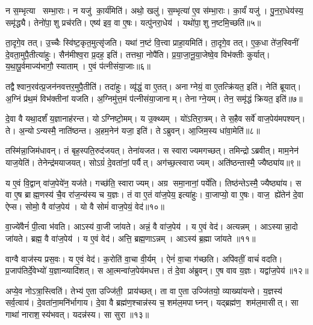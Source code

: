 न स॒म्भृत्या सम्भा॒राः।
न यजु॑ का॒र्य॑मिति॑।
अथो॒ खलु॑।
स॒म्भृत्या॑ ए॒व स॑म्भा॒राः।
का॒र्यं॑ यजु॑।
पु॒न॒रा॒धेय॑स्य॒ समृ॑द्ध्यै।
तेनो॑पा॒शु प्रच॑रति।
एष्य॑ इव॒ वा ए॒षः।
यत्पु॑नरा॒धेय॑।
यथो॑पा॒शु न॒ष्टमि॒च्छति॑॥५॥

ता॒दृगे॒व तत्।
उ॒च्चैः स्वि॑ष्ट॒कृत॒मुत्सृ॑जति।
यथा॑ न॒ष्टं वि॒त्त्वा प्राहा॒यमिति॑।
ता॒दृगे॒व तत्।
ए॒क॒धा ते॑ज॒स्विनीं दे॒वता॒मुपै॒तीत्या॑हुः।
सैन॑मीश्व॒रा प्र॒दह॒ इति॑।
तत्तथा॒ नोपै॑ति।
प्र॒या॒जा॒नू॒या॒जेष्वे॒व विभ॑क्तीः कुर्यात्।
य॒था॒पू॒र्वमाज्य॑भागौ॒ स्याताम्।
ए॒वं प॑त्नीसंया॒जाः॥६॥

तद्वैश्वान॒रव॑त्प्र॒जन॑नवत्तर॒मुपै॒तीति॑।
तदा॑हुः।
व्यृ॑द्धं॒ वा ए॒तत्।
अनाग्नेयं॒ वा ए॒तत्क्रि॑यत॒ इति॑।
नेति॑ ब्रूयात्।
अ॒ग्निं प्र॑थ॒मं विभ॑क्तीनां यजति।
अ॒ग्निमु॑त्त॒मं प॑त्नीसंया॒जानाम्।
तेनाग्ने॒यम्।
तेन॒ समृ॑द्धं क्रियत॒ इति॑॥७॥\anuvakamend[अ॒रु॒न्ध॒तै॒व तद्भ॑वति॒ सम्भृ॑तसम्भार॒ इत्या॑हुरि॒च्छति॑ पत्नीसंया॒जा नव॑ च]

दे॒वा वै यथा॒दर्\mbox{}शं॑ य॒ज्ञानाह॑रन्त।
योऽग्निष्टो॒मम्।
य उ॒क्थ्यम्।
यो॑ऽतिरा॒त्रम्।
ते स॒हैव सर्वे॑ वाज॒पेय॑मपश्यन्।
ते।
अ॒न्योऽन्यस्मै॒ नाति॑ष्ठन्त।
अ॒हम॒नेन॑ यजा॒ इति॑।
तेऽब्रुवन्।
आ॒जिम॒स्य धा॑वा॒मेति॑॥८॥

तस्मि॑न्ना॒जिम॑धावन्।
तं बृह॒स्पति॒रुद॑जयत्।
तेना॑यजत।
स स्वाराज्यमगच्छत्।
तमिन्द्रोऽब्रवीत्।
माम॒नेन॑ याज॒येति॑।
तेनेन्द्र॑मयाजयत्।
सोऽग्रं॑ दे॒वता॑नां॒ पर्यैत्।
अग॑च्छ॒त्स्वाराज्यम्।
अति॑ष्ठन्तास्मै॒ ज्यैष्ठ्या॑य॥९॥

य ए॒वं वि॒द्वान् वा॑ज॒पेये॑न॒ यज॑ते।
गच्छ॑ति॒ स्वाराज्यम्।
अग्र समा॒नानां॒ पर्ये॑ति।
तिष्ठ॑न्तेऽस्मै॒ ज्यैष्ठ्या॑य।
स वा ए॒ष ब्राह्म॒णस्य॑ चै॒व रा॑ज॒न्य॑स्य च य॒ज्ञः।
तं वा ए॒तं वा॑ज॒पेय॒ इत्या॑हुः।
वा॒जाप्यो॒ वा ए॒षः।
वाज॒ ह्ये॑तेन॑ दे॒वा ऐप्स\sn{}।
सोमो॒ वै वा॑ज॒पेय॑।
यो वै सोमं॑ वाज॒पेयं॒ वेद॑॥१०॥

वा॒ज्ये॑वैनं॑ पी॒त्वा भ॑वति।
आऽस्य॑ वा॒जी जा॑यते।
अन्नं॒ वै वा॑ज॒पेय॑।
य ए॒वं वेद॑।
अत्यन्नम्।
आऽस्यान्ना॒दो जा॑यते।
ब्रह्म॒ वै वा॑ज॒पेय॑।
य ए॒वं वेद॑।
अत्ति॒ ब्रह्म॒णाऽन्नम्।
आऽस्य॑ ब्र॒ह्मा जा॑यते ॥११॥

वाग्वै वाज॑स्य प्रस॒वः।
य ए॒वं वेद॑।
क॒रोति॑ वा॒चा वी॒र्यम्।
ऐनं॑ वा॒चा ग॑च्छति।
अपि॑वतीं॒ वाचं॑ वदति।
प्र॒जाप॑तिर्दे॒वेभ्यो॑ य॒ज्ञान्व्यादि॑शत्।
स आ॒त्मन्वा॑ज॒पेय॑मधत्त।
तं दे॒वा अ॑ब्रुवन्।
ए॒ष वाव य॒ज्ञः।
यद्वा॑ज॒पेय॑॥१२॥

अप्ये॒व नोऽत्रा॒स्त्विति॑।
तेभ्य॑ ए॒ता उज्जि॑ती॒ प्राय॑च्छत्।
ता वा ए॒ता उज्जि॑तयो॒ व्याख्या॑यन्ते।
य॒ज्ञस्य॑ सर्व॒त्वाय॑।
दे॒वता॑ना॒मनि॑र्भागाय।
दे॒वा वै ब्रह्म॑ण॒श्चान्न॑स्य च॒ शम॑ल॒मपाघ्नन्।
यद्ब्रह्म॑ण॒ शम॑ल॒मासीत्।
सा गाथा॑ नाराश॒स्य॑भवत्।
यदन्न॑स्य।
सा सुरा॥१३॥

